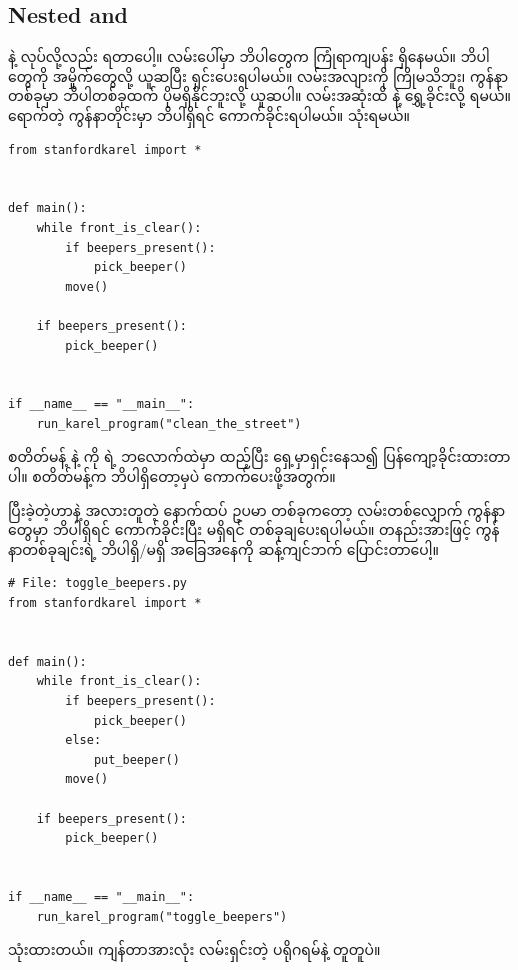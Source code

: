 \subsection*{Nested  and }
 နဲ့   လုပ်လို့လည်း ရတာပေါ့။ လမ်းပေါ်မှာ ဘိပါတွေက ကြုံရာကျပန်း  ရှိနေမယ်။ ဘိပါတွေကို အမှိုက်တွေလို့ ယူဆပြီး ရှင်းပေးရပါမယ်။ လမ်းအလျားကို ကြိုမသိဘူး၊ ကွန်နာတစ်ခုမှာ ဘိပါတစ်ခုထက် ပိုမရှိနိုင်ဘူးလို့ ယူဆပါ။  လမ်းအဆုံးထိ   နဲ့ ရွှေ့ခိုင်းလို့ ရမယ်။ ရောက်တဲ့ ကွန်နာတိုင်းမှာ ဘိပါရှိရင် ကောက်ခိုင်းရပါမယ်။  သုံးရမယ်။
%
\setlength{\fboxsep}{0pt}
\begin{verbatim}
from stanfordkarel import *


def main():
    while front_is_clear():
        if beepers_present():
            pick_beeper()
        move()

    if beepers_present():
        pick_beeper()


if __name__ == "__main__":
    run_karel_program("clean_the_street")

\end{verbatim}
%
 စတိတ်မန့် နဲ့  ကို   ရဲ့ ဘလောက်ထဲမှာ ထည့်ပြီး ရှေ့မှာရှင်းနေသ၍ ပြန်ကျော့ခိုင်းထားတာပါ။  စတိတ်မန့်က ဘိပါရှိတော့မှပဲ ကောက်ပေးဖို့အတွက်။

ပြီးခဲ့တဲ့ဟာနဲ့ အလားတူတဲ့ နောက်ထပ် ဥပမာ တစ်ခုကတော့ လမ်းတစ်လျှောက် ကွန်နာတွေမှာ ဘိပါရှိရင် ကောက်ခိုင်းပြီး မရှိရင် တစ်ခုချပေးရပါမယ်။ တနည်းအားဖြင့် ကွန်နာတစ်ခုချင်းရဲ့ ဘိပါရှိ/မရှိ အခြေအနေကို ဆန့်ကျင်ဘက် ပြောင်းတာပေါ့။
%
\setlength{\fboxsep}{0pt}
\begin{verbatim}
# File: toggle_beepers.py
from stanfordkarel import *


def main():
    while front_is_clear():
        if beepers_present():
            pick_beeper()
        else:
            put_beeper()
        move()

    if beepers_present():
        pick_beeper()


if __name__ == "__main__":
    run_karel_program("toggle_beepers")
\end{verbatim}
%
 သုံးထားတယ်။ ကျန်တာအားလုံး လမ်းရှင်းတဲ့ ပရိုဂရမ်နဲ့ တူတူပဲ။


